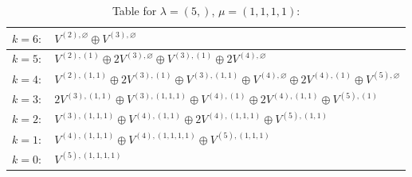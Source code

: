 \documentclass[a4paper,12pt]{article}
\begin{document}
\renewcommand{\arraystretch}{1.6} 
\begin{table}[H]
\centering
\caption{Table for $\lambda = (5,)$, $\mu = (1, 1, 1, 1)$:}
\begin{tabular}{|>{\centering\arraybackslash}p{15cm}|}
\hline
 $k = 6: \quad V^{(2), \varnothing} \oplus V^{(3), \varnothing} $ \\ \hline
 $k = 5: \quad V^{(2), (1)} \oplus 2 V^{(3), \varnothing} \oplus V^{(3), (1)} \oplus 2 V^{(4), \varnothing} $ \\ \hline
 $k = 4: \quad V^{(2), (1, 1)} \oplus 2 V^{(3), (1)} \oplus V^{(3), (1, 1)} \oplus V^{(4), \varnothing} \oplus 2 V^{(4), (1)} \oplus V^{(5), \varnothing} $ \\ \hline
 $k = 3: \quad 2 V^{(3), (1, 1)} \oplus V^{(3), (1, 1, 1)} \oplus V^{(4), (1)} \oplus 2 V^{(4), (1, 1)} \oplus V^{(5), (1)} $ \\ \hline
 $k = 2: \quad V^{(3), (1, 1, 1)} \oplus V^{(4), (1, 1)} \oplus 2 V^{(4), (1, 1, 1)} \oplus V^{(5), (1, 1)} $ \\ \hline
 $k = 1: \quad V^{(4), (1, 1, 1)} \oplus V^{(4), (1, 1, 1, 1)} \oplus V^{(5), (1, 1, 1)} $ \\ \hline
 $k = 0: \quad V^{(5), (1, 1, 1, 1)} $ \\ \hline
\end{tabular}
\end{table}
\end{document}
